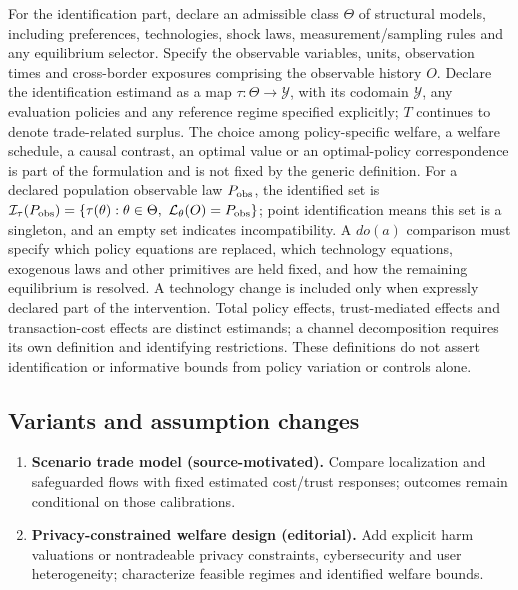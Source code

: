\documentclass[11pt,a4paper]{article}
\begin{document}
For the identification part, declare an admissible class \(\Theta\) of structural models, including preferences, technologies, shock laws, measurement/sampling rules and any equilibrium selector. Specify the observable variables, units, observation times and cross-border exposures comprising the observable history \(O\). Declare the identification estimand as a map \(\tau:\Theta\to\mathcal Y\), with its codomain \(\mathcal Y\), any evaluation policies and any reference regime specified explicitly; \(T\) continues to denote trade-related surplus. The choice among policy-specific welfare, a welfare schedule, a causal contrast, an optimal value or an optimal-policy correspondence is part of the formulation and is not fixed by the generic definition. For a declared population observable law \(P_{\rm obs}\), the identified set is \(\mathcal I_\tau(P_{\rm obs})=\{\tau(\theta):\theta\in\Theta,\ \mathcal L_\theta(O)=P_{\rm obs}\}\); point identification means this set is a singleton, and an empty set indicates incompatibility. A \(do(a)\) comparison must specify which policy equations are replaced, which technology equations, exogenous laws and other primitives are held fixed, and how the remaining equilibrium is resolved. A technology change is included only when expressly declared part of the intervention. Total policy effects, trust-mediated effects and transaction-cost effects are distinct estimands; a channel decomposition requires its own definition and identifying restrictions. These definitions do not assert identification or informative bounds from policy variation or controls alone.
\subsection*{Variants and assumption changes}
\begin{enumerate}
\item \textbf{Scenario trade model (source-motivated).} Compare localization and safeguarded flows with fixed estimated cost/trust responses; outcomes remain conditional on those calibrations.
\item \textbf{Privacy-constrained welfare design (editorial).} Add explicit harm valuations or nontradeable privacy constraints, cybersecurity and user heterogeneity; characterize feasible regimes and identified welfare bounds.
\end{enumerate}
\end{document}
